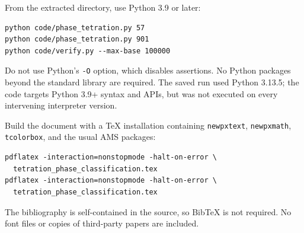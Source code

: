 \documentclass[11pt,letterpaper]{article}
\numberwithin{equation}{section}
\theoremstyle{definition}
\begin{document}
From the extracted directory, use Python 3.9 or later:
\begin{verbatim}
python code/phase_tetration.py 57
python code/phase_tetration.py 901
python code/verify.py --max-base 100000
\end{verbatim}
Do not use Python's \texttt{-O} option, which disables assertions. No Python
packages beyond the standard library are required. The saved run used Python
3.13.5; the code targets Python 3.9+ syntax and APIs, but was not executed on
every intervening interpreter version.

Build the document with a \TeX{} installation containing \texttt{newpxtext},
\texttt{newpxmath}, \texttt{tcolorbox}, and the usual AMS packages:
\begin{verbatim}
pdflatex -interaction=nonstopmode -halt-on-error \
  tetration_phase_classification.tex
pdflatex -interaction=nonstopmode -halt-on-error \
  tetration_phase_classification.tex
\end{verbatim}
The bibliography is self-contained in the source, so Bib\TeX{} is not required.
No font files or copies of third-party papers are included.
\end{document}
